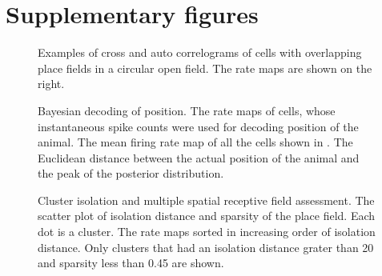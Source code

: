
\chapter{Supplementary figures} %

\label{supl} %



\begin{figure}
\centering
{}
\end{figure}

\begin{figure}
\ContinuedFloat %
\centering
{}
\caption[]{Examples of cross and auto correlograms of cells with overlapping place fields in a circular open field. The rate maps are shown on the right.}
\label{fig:ccgs}
\end{figure}

\begin{figure}
\centering
{}
\caption[]{Bayesian decoding of position.  The rate maps of cells, whose instantaneous spike counts were used for decoding position of the animal.  The mean firing rate map of all the cells shown in .  The Euclidean distance between the actual position of the animal and the peak of the posterior distribution.}
\label{fig:decodePos}
\end{figure}

\begin{figure}
\centering
{}
\caption[]{Cluster isolation and multiple spatial receptive field assessment.  The scatter plot of isolation distance and sparsity of the place field. Each dot is a cluster.  The rate maps sorted in increasing order of isolation distance. Only clusters that had an isolation distance grater than 20 and sparsity less than 0.45 are shown.}
\label{fig:cluq}
\end{figure}